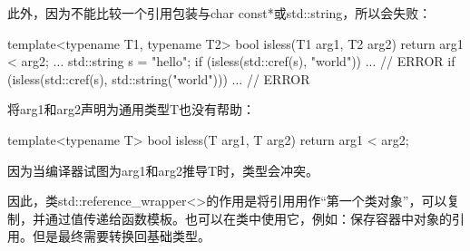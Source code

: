 此外，因为不能比较一个引用包装与char const*或std::string，所以会失败：

\begin{cpp}
template<typename T1, typename T2>
bool isless(T1 arg1, T2 arg2) {
	return arg1 < arg2;
}
...
std::string s = "hello";
if (isless(std::cref(s), "world")) ... // ERROR
if (isless(std::cref(s), std::string("world"))) ... // ERROR
\end{cpp}

将arg1和arg2声明为通用类型T也没有帮助：

\begin{cpp}
template<typename T>
bool isless(T arg1, T arg2) {
	return arg1 < arg2;
}
\end{cpp}

因为当编译器试图为arg1和arg2推导T时，类型会冲突。

因此，类std::reference\_wrapper<>的作用是将引用用作“第一个类对象”，可以复制，并通过值传递给函数模板。也可以在类中使用它，例如：保存容器中对象的引用。但是最终需要转换回基础类型。











